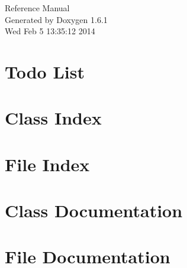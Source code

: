 \documentclass[a4paper]{book}
\begin{document}
\hypersetup{pageanchor=false}
\begin{titlepage}
\vspace*{7cm}
\begin{center}
{\Large Reference Manual}\\
\vspace*{1cm}
{\large Generated by Doxygen 1.6.1}\\
\vspace*{0.5cm}
{\small Wed Feb 5 13:35:12 2014}\\
\end{center}
\end{titlepage}
\clearemptydoublepage
{}
\tableofcontents
\clearemptydoublepage
{}
\hypersetup{pageanchor=true}
\chapter{Todo List}
\label{todo}
\hypertarget{todo}{}

\chapter{Class Index}

\chapter{File Index}

\chapter{Class Documentation}


















\chapter{File Documentation}


\printindex
\end{document}
